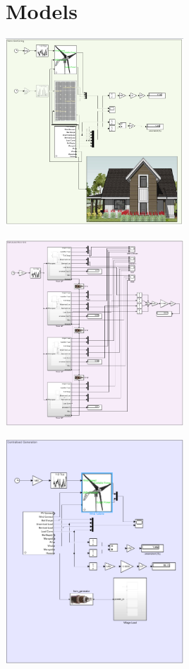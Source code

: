 \documentclass[journal]{IEEEtran}
\begin{document}
        \section{Models}
        \label{ap:models}
        \begin{center}
                \includegraphics[width=0.5\textwidth]{fig/nano_sim.png}
                
                \includegraphics[width=0.5\textwidth]{fig/distrib_sim.png}
                
                \includegraphics[width=0.5\textwidth]{fig/central_sim.png}
        \end{center}
        



\newpage


\end{document}
